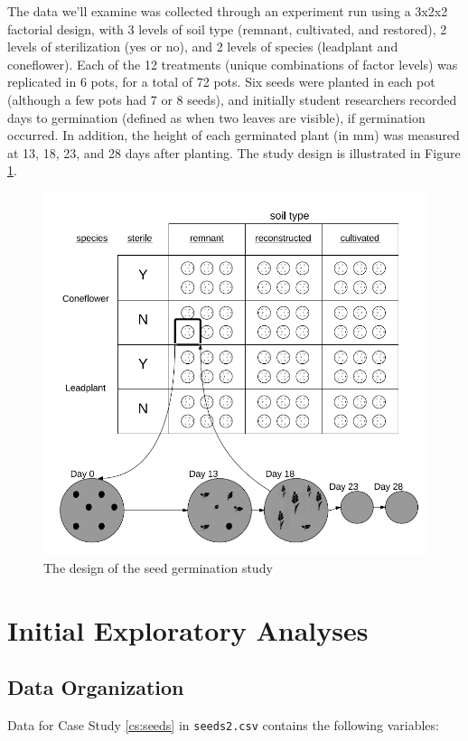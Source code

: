\documentclass[
]{krantz}
\begin{document}
The data we'll examine was collected through an experiment run using a 3x2x2 factorial design, with 3 levels of soil type (remnant, cultivated, and restored), 2 levels of sterilization (yes or no), and 2 levels of species (leadplant and coneflower). Each of the 12 treatments (unique combinations of factor levels) was replicated in 6 pots, for a total of 72 pots. Six seeds were planted in each pot (although a few pots had 7 or 8 seeds), and initially student researchers recorded days to germination (defined as when two leaves are visible), if germination occurred. In addition, the height of each germinated plant (in mm) was measured at 13, 18, 23, and 28 days after planting. The study design is illustrated in Figure \ref{fig:seedstudy}.

\begin{figure}
\includegraphics[width=0.8\linewidth]{data/StudyDesignDiagram} \caption{The design of the seed germination study}\label{fig:seedstudy}
\end{figure}

\hypertarget{explore3}{%
\section{Initial Exploratory Analyses}\label{explore3}}

\hypertarget{organizedata3}{%
\subsection{Data Organization}\label{organizedata3}}

Data for Case Study \ref{cs:seeds} in \texttt{seeds2.csv} contains the following variables:
\end{document}
